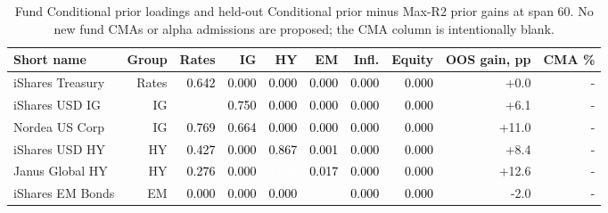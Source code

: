 \documentclass[a4paper,review]{cas-sc}
\begin{document}
\begin{table}[pos=htbp]
\centering
\small
\caption{Fund Conditional prior loadings and held-out Conditional prior minus Max-R2 prior gains at span 60. No new fund CMAs or alpha admissions are proposed; the CMA column is intentionally blank.}
\begin{adjustbox}{max width=\linewidth}
\begin{tabular}{lrrrrrrrrr}
\toprule
Short name & Group & Rates & IG & HY & EM & Infl. & Equity & OOS gain, pp & CMA \% \\
\midrule
iShares Treasury & Rates & \cellcolor[HTML]{F09C7B}\textcolor{black}{0.642} & \cellcolor[HTML]{FFFFFF}\textcolor{black}{0.000} & \cellcolor[HTML]{FFFFFF}\textcolor{black}{0.000} & \cellcolor[HTML]{FFFFFF}\textcolor{black}{0.000} & \cellcolor[HTML]{FFFFFF}\textcolor{black}{0.000} & \cellcolor[HTML]{FFFFFF}\textcolor{black}{0.000} & +0.0 & - \\
iShares USD IG & IG & \cellcolor[HTML]{CE4F45}\textcolor{white}{0.961} & \cellcolor[HTML]{E48066}\textcolor{black}{0.750} & \cellcolor[HTML]{FFFFFF}\textcolor{black}{0.000} & \cellcolor[HTML]{FFFFFF}\textcolor{black}{0.000} & \cellcolor[HTML]{FFFFFF}\textcolor{black}{0.000} & \cellcolor[HTML]{FFFFFF}\textcolor{black}{0.000} & +6.1 & - \\
Nordea US Corp & IG & \cellcolor[HTML]{E37E64}\textcolor{black}{0.769} & \cellcolor[HTML]{EE9677}\textcolor{black}{0.664} & \cellcolor[HTML]{FFFFFF}\textcolor{black}{0.000} & \cellcolor[HTML]{FFFFFF}\textcolor{black}{0.000} & \cellcolor[HTML]{FFFFFF}\textcolor{black}{0.000} & \cellcolor[HTML]{FFFFFF}\textcolor{black}{0.000} & +11.0 & - \\
iShares USD HY & HY & \cellcolor[HTML]{F9C4A9}\textcolor{black}{0.427} & \cellcolor[HTML]{FFFFFF}\textcolor{black}{0.000} & \cellcolor[HTML]{DA6853}\textcolor{black}{0.867} & \cellcolor[HTML]{F7F6F6}\textcolor{black}{0.001} & \cellcolor[HTML]{FFFFFF}\textcolor{black}{0.000} & \cellcolor[HTML]{FFFFFF}\textcolor{black}{0.000} & +8.4 & - \\
Janus Global HY & HY & \cellcolor[HTML]{FDDDCB}\textcolor{black}{0.276} & \cellcolor[HTML]{FFFFFF}\textcolor{black}{0.000} & \cellcolor[HTML]{BF3338}\textcolor{white}{1.081} & \cellcolor[HTML]{F7F5F4}\textcolor{black}{0.017} & \cellcolor[HTML]{FFFFFF}\textcolor{black}{0.000} & \cellcolor[HTML]{FFFFFF}\textcolor{black}{0.000} & +12.6 & - \\
iShares EM Bonds & EM & \cellcolor[HTML]{FFFFFF}\textcolor{black}{0.000} & \cellcolor[HTML]{FFFFFF}\textcolor{black}{0.000} & \cellcolor[HTML]{FFFFFF}\textcolor{black}{0.000} & \cellcolor[HTML]{67001F}\textcolor{white}{2.045} & \cellcolor[HTML]{FFFFFF}\textcolor{black}{0.000} & \cellcolor[HTML]{FFFFFF}\textcolor{black}{0.000} & -2.0 & - \\

\end{tabular}
\end{adjustbox}
\end{table}
\end{document}
